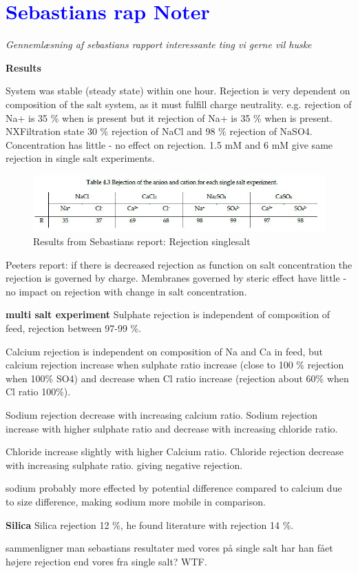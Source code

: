 \section{\textcolor{blue}{Sebastians rap Noter}}

\textit{Gennemlæsning af sebastians rapport interessante ting vi gerne vil huske}

\textbf{Results}\citep{Sebastians_master_2020}

System was stable (steady state) within one hour.
Rejection is very dependent on composition of the salt system, as it must fulfill charge neutrality. e.g. rejection of Na+ is 35 \% when  is present but it rejection of Na+ is 35 \% when  is present.
NXFiltration state 30 \% rejection of NaCl and 98 \% rejection of NaSO4. 
Concentration has little - no effect on rejection. 1.5 mM and 6 mM give same rejection in single salt experiments. 


\begin{figure}[H]
    \centering
    \includegraphics[width=1\textwidth]{Billeder/data/single_salt/Sebastian_rejection.JPG}
    \caption{Results from Sebastians report: Rejection singlesalt}
    \label{fig:rejection_sebastian_singlesalt}
\end{figure}

Peeters report: if there is decreased rejection as function on salt concentration the rejection is governed by charge. 
Membranes governed by steric effect have little - no impact on rejection with change in salt concentration. 

\textbf{multi salt experiment}
Sulphate rejection is independent of composition of feed, rejection between 97-99 \%. 

Calcium rejection is independent on composition of Na and Ca in feed, but calcium rejection increase when sulphate ratio increase (close to 100 \% rejection when 100\% SO4) and decrease when Cl ratio increase (rejection about 60\% when Cl ratio 100\%). 

Sodium rejection decrease with increasing calcium ratio. Sodium rejection increase with higher sulphate ratio and decrease with increasing chloride ratio. 

Chloride increase slightly with higher Calcium ratio. Chloride rejection decrease with increasing sulphate ratio. giving negative rejection. 

sodium probably more effected by potential difference compared to calcium due to size difference, making sodium more mobile in comparison. 


\textbf{Silica}
Silica rejection 12 \%, he found literature with rejection 14 \%. 


sammenligner man sebastians resultater med vores på single salt har han fået højere rejection end vores fra single salt? WTF. 